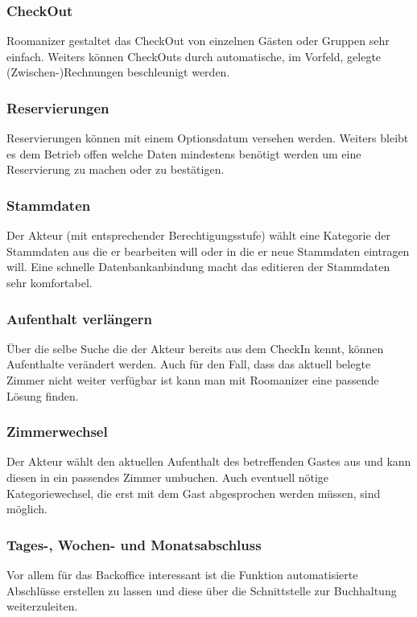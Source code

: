 \documentclass[10pt,a4paper,titlepage]{article}
\begin{document}
\subsubsection{CheckOut }
Roomanizer gestaltet das CheckOut von einzelnen Gästen oder Gruppen sehr einfach. Weiters können CheckOuts durch automatische, im Vorfeld, gelegte (Zwischen-)Rechnungen beschleunigt werden.

\subsubsection{Reservierungen}
Reservierungen können mit einem Optionsdatum versehen werden. Weiters bleibt es dem Betrieb offen welche Daten mindestens benötigt werden um eine Reservierung zu machen oder zu bestätigen.

\subsubsection{Stammdaten }
Der Akteur (mit entsprechender Berechtigungsstufe) wählt eine Kategorie der Stammdaten aus die er bearbeiten will oder in die er neue Stammdaten eintragen will. Eine schnelle Datenbankanbindung macht das editieren der Stammdaten sehr komfortabel.

\subsubsection{Aufenthalt verlängern }
Über die selbe Suche die der Akteur bereits aus dem CheckIn kennt, können Aufenthalte verändert werden. Auch für den Fall, dass das aktuell belegte Zimmer nicht weiter verfügbar ist kann man mit Roomanizer eine passende Lösung finden. 

\subsubsection{Zimmerwechsel}
Der Akteur wählt den aktuellen Aufenthalt des betreffenden Gastes aus und kann diesen in ein passendes Zimmer umbuchen. Auch eventuell nötige Kategoriewechsel, die erst mit dem Gast abgesprochen werden müssen, sind möglich.

\subsubsection{Tages-, Wochen- und Monatsabschluss}
Vor allem für das Backoffice interessant ist die Funktion automatisierte Abschlüsse erstellen zu lassen und diese über die Schnittstelle zur Buchhaltung weiterzuleiten.
\end{document}
